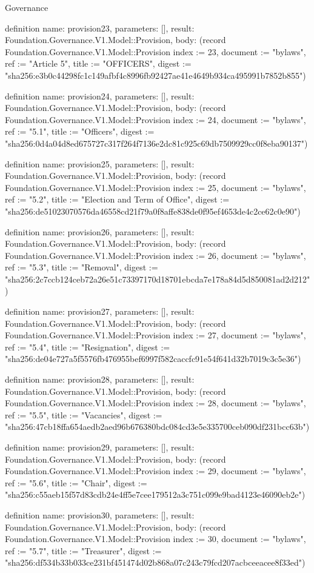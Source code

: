 \begin{lexlean}{Governance}
\begin{semanticmodule}
definition{
  name: provision23,
  parameters: [],
  result: Foundation.Governance.V1.Model::Provision,
  body: (record Foundation.Governance.V1.Model::Provision {index := 23, document := "bylaws", ref := "Article 5", title := "OFFICERS", digest := "sha256:e3b0c44298fc1c149afbf4c8996fb92427ae41e4649b934ca495991b7852b855"})
}

definition{
  name: provision24,
  parameters: [],
  result: Foundation.Governance.V1.Model::Provision,
  body: (record Foundation.Governance.V1.Model::Provision {index := 24, document := "bylaws", ref := "5.1", title := "Officers", digest := "sha256:0d4a04d8ed675727c317f264f7136e2dc81c925c69db7509929cc0f8eba90137"})
}

definition{
  name: provision25,
  parameters: [],
  result: Foundation.Governance.V1.Model::Provision,
  body: (record Foundation.Governance.V1.Model::Provision {index := 25, document := "bylaws", ref := "5.2", title := "Election and Term of Office", digest := "sha256:de51023070576da46558cd21f79a0f8affe838de0f95ef4653de4c2ce62c0e90"})
}

definition{
  name: provision26,
  parameters: [],
  result: Foundation.Governance.V1.Model::Provision,
  body: (record Foundation.Governance.V1.Model::Provision {index := 26, document := "bylaws", ref := "5.3", title := "Removal", digest := "sha256:2c7ccb124ceb72a26e51c73397170d18701ebcda7e178a84d5d850081ad2d212"})
}

definition{
  name: provision27,
  parameters: [],
  result: Foundation.Governance.V1.Model::Provision,
  body: (record Foundation.Governance.V1.Model::Provision {index := 27, document := "bylaws", ref := "5.4", title := "Resignation", digest := "sha256:de04e727a5f5576fb476955bef6997f582caccfc91e54f641d32b7019c3c5e36"})
}

definition{
  name: provision28,
  parameters: [],
  result: Foundation.Governance.V1.Model::Provision,
  body: (record Foundation.Governance.V1.Model::Provision {index := 28, document := "bylaws", ref := "5.5", title := "Vacancies", digest := "sha256:47cb18ffa654aedb2aed96b676380bdc084cd3e5e335700ceb090df231bcc63b"})
}

definition{
  name: provision29,
  parameters: [],
  result: Foundation.Governance.V1.Model::Provision,
  body: (record Foundation.Governance.V1.Model::Provision {index := 29, document := "bylaws", ref := "5.6", title := "Chair", digest := "sha256:c55aeb15f57d83cdb24e4ff5e7cee179512a3c751c099e9bad4123e46090eb2e"})
}

definition{
  name: provision30,
  parameters: [],
  result: Foundation.Governance.V1.Model::Provision,
  body: (record Foundation.Governance.V1.Model::Provision {index := 30, document := "bylaws", ref := "5.7", title := "Treasurer", digest := "sha256:df534b33b033ce231bf451474d02b868a07c243c79fcd207acbceeacee8f33ed"})
}


\end{semanticmodule}
\end{lexlean}
